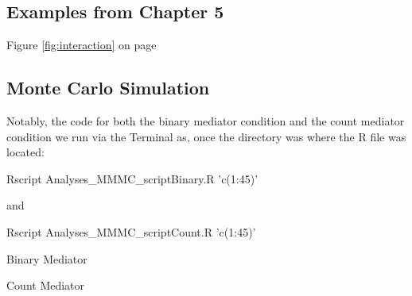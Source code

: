 \documentclass[]{DissertateUSU}
\newenvironment{Shaded}{\begin{snugshade}}{\end{snugshade}}
\newcommand{\StringTok}[1]{\textcolor[rgb]{0.31,0.60,0.02}{#1}}
\newcommand{\ExtensionTok}[1]{#1}
\newcommand{\NormalTok}[1]{#1}
\begin{document}
\small

\normalsize

\clearpage

\subsection*{Examples from Chapter 5}\label{examples-from-chapter-5}

Figure \ref{fig:interaction} on page \pageref{fig:interaction}

\small

\normalsize

\clearpage

\subsection*{Monte Carlo Simulation}\label{monte-carlo-simulation}

Notably, the code for both the binary mediator condition and the count
mediator condition we run via the Terminal as, once the directory was
where the R file was located:

\small

\begin{Shaded}
\begin{Highlighting}[]
\ExtensionTok{Rscript}\NormalTok{ Analyses_MMMC_scriptBinary.R }\StringTok{'c(1:45)'}
\end{Highlighting}
\end{Shaded}

\normalsize

\noindent and

\small

\begin{Shaded}
\begin{Highlighting}[]
\ExtensionTok{Rscript}\NormalTok{ Analyses_MMMC_scriptCount.R }\StringTok{'c(1:45)'}
\end{Highlighting}
\end{Shaded}

\normalsize

Binary Mediator

\small

\normalsize

Count Mediator

\small

\normalsize

\clearpage
\end{document}

